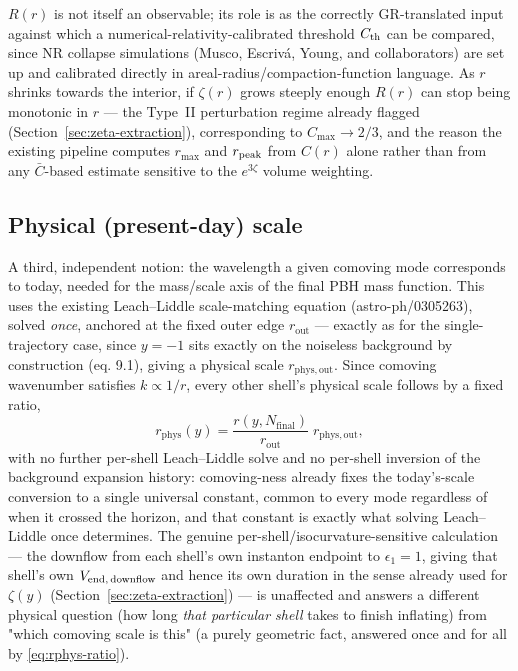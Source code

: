 \documentclass[a4paper,11pt]{article}
\newcommand{\Nfinal}{N_{\mathrm{final}}}     %
\newcommand{\epsSR}{\epsilon_1}              %
\newcommand{\rad}{r}                         %
\newcommand{\yco}{y}                         %
\newcommand{\rout}{\rad_{\mathrm{out}}}      %
\newcommand{\rphys}{\rad_{\mathrm{phys}}}    %
\newcommand{\zprofile}{\zeta}                %
\begin{document}
$R(\rad)$ is not itself an observable; its role is as the correctly
GR-translated input against which a numerical-relativity-calibrated
threshold $C_{\rm th}$ can be compared, since NR collapse simulations
(Musco, Escriv\'a, Young, and collaborators) are set up and calibrated
directly in areal-radius/compaction-function language. As $\rad$ shrinks
towards the interior, if $\zprofile(\rad)$ grows steeply enough $R(\rad)$
can stop being monotonic in $\rad$ --- the Type~II perturbation regime
already flagged (Section~\ref{sec:zeta-extraction}), corresponding to
$C_{\max}\to2/3$, and the reason the existing pipeline computes $r_{\max}$
and $r_{\rm peak}$ from $C(\rad)$ alone rather than from any
$\bar C$-based estimate sensitive to the $e^{3\zprofile}$ volume
weighting.

\subsection{Physical (present-day) scale}

A third, independent notion: the wavelength a given comoving mode
corresponds to today, needed for the mass/scale axis of the final PBH
mass function. This uses the existing Leach--Liddle scale-matching
equation (astro-ph/0305263), solved \emph{once}, anchored at the fixed
outer edge $\rout$ --- exactly as for the single-trajectory case, since
$\yco=-1$ sits exactly on the noiseless background by construction
(eq. 9.1), giving a physical scale $\rad_{\mathrm{phys,out}}$. Since comoving
wavenumber satisfies $k\propto1/\rad$, every other shell's physical scale
follows by a fixed ratio,
\begin{equation}
    \rphys(\yco) = \frac{\rad(\yco,\Nfinal)}{\rout}\;\rad_{\mathrm{phys,out}} ,
    \label{eq:rphys-ratio}
\end{equation}
with no further per-shell Leach--Liddle solve and no per-shell inversion
of the background expansion history: comoving-ness already fixes the
today's-scale conversion to a single universal constant, common to every
mode regardless of when it crossed the horizon, and that constant is
exactly what solving Leach--Liddle once determines. The genuine
per-shell/isocurvature-sensitive calculation --- the downflow from each
shell's own instanton endpoint to $\epsSR=1$, giving that shell's own
$V_{\rm end,\,downflow}$ and hence its own duration in the sense already
used for $\zprofile(\yco)$ (Section~\ref{sec:zeta-extraction}) --- is
unaffected and answers a different physical question (how long \emph{that
particular shell} takes to finish inflating) from "which comoving scale is
this" (a purely geometric fact, answered once and for all by
\eqref{eq:rphys-ratio}).
\end{document}
